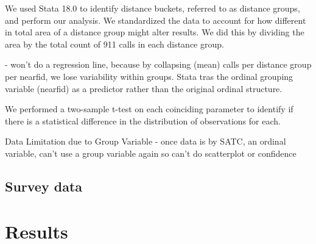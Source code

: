 \documentclass[12pt]{article}
\begin{document}
We used Stata 18.0 to identify distance buckets, referred to as distance groups, and perform our analysis. We standardized the data to account for how different in total area of a distance group might alter results. We did this by dividing the area by the total count of 911 calls in each distance group.

- won't do a regression line, because by collapsing (mean) calls per distance group per nearfid, we lose variability within groups. Stata tras the ordinal grouping variable (nearfid) as a predictor rather than the original ordinal structure. 

We performed a two-sample t-test on each coinciding parameter to identify if there is a statistical difference in the distribution of observations for each. 


Data Limitation due to Group Variable - once data is by SATC, an ordinal variable, can't use a group variable again so can't do scatterplot or confidence

\subsection{Survey data}

\section{Results}
\label{sec:result}
\end{document}

